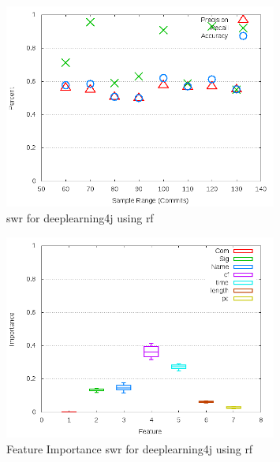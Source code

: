 \begin{figure}[!t]
\centering
\includegraphics[width=0.8\textwidth]{images/rf/test_1/deeplearning4j_sample_range.png}
\caption{\gls{swr} for deeplearning4j using \gls{rf}}
\label{fig:test_1_deeplearning4j_rf}
\end{figure}

\begin{figure}[!t]
\centering
\includegraphics[width=0.8\textwidth]{images/rf/test_1/deeplearning4j_importance.png}
\caption{Feature Importance \gls{swr} for deeplearning4j using \gls{rf}}
\label{fig:test_1_deeplearning4j_rf_importance}
\end{figure}

